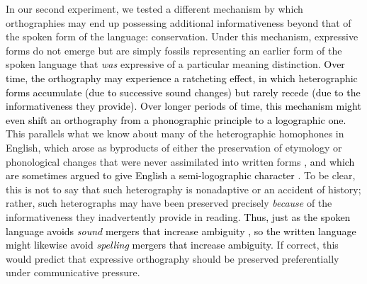 \documentclass[doc,biblatex]{apa7}
\newcommand\firstrevision[1]{\textcolor{black}{#1}}
\begin{document}
In our second experiment, we tested a different mechanism by which orthographies may end up possessing additional informativeness beyond that of the spoken form of the language: conservation. Under this mechanism, expressive forms do not emerge but are simply fossils representing an earlier form of the spoken language that \textit{was} expressive of a particular meaning distinction. \firstrevision{Over time, the orthography may experience a ratcheting effect, in which heterographic forms accumulate (due to successive sound changes) but rarely recede (due to the informativeness they provide). Over longer periods of time, this mechanism might even shift an orthography from a phonographic principle to a logographic one.} This parallels what we know about many of the heterographic homophones in English, which arose as byproducts of either the preservation of etymology or phonological changes that were never assimilated into written forms \parencite{Berg:2021}, \firstrevision{and which are sometimes argued to give English a semi-logographic character \parencite{Chomsky:1968, Coulmas:1991, DeFransis:1989, Zachrisson:1931}}. To be clear, this is not to say that such heterography is nonadaptive or an accident of history; rather, such heterographs may have been preserved precisely \textit{because} of the informativeness they inadvertently provide in reading. \firstrevision{Thus, just as the spoken language avoids \textit{sound} mergers that increase ambiguity \parencite[e.g.,][]{Wedel:2013}, so the written language might likewise avoid \textit{spelling} mergers that increase ambiguity.} If correct, this would predict that expressive orthography should be preserved preferentially under communicative pressure.
\end{document}
